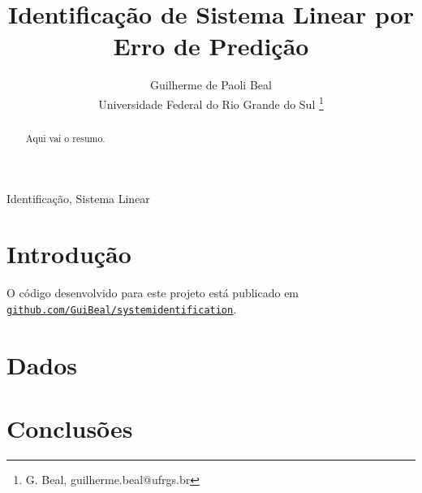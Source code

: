 \documentclass{ppgeesa}
\begin{document}

\title{Identificação de Sistema Linear por Erro de Predição}
\author{Guilherme de Paoli Beal
  \\
  {\small Universidade Federal do Rio Grande do Sul}
  \thanks{G. Beal, guilherme.beal@ufrgs.br}
}
\maketitle
\thispagestyle{empty}\pagestyle{empty}

\begin{abstract}
  Aqui vai o resumo.
\end{abstract}

\begin{IEEEkeywords}
  Identificação, Sistema Linear
\end{IEEEkeywords}

\section{Introdução}

O código desenvolvido para este projeto está publicado em \href{https://github.com/GuiBeal/system-identification}{\texttt{github.com/GuiBeal/system\-identification}}.

\section{Dados}

\section{Conclusões}

% 
% 
\end{document}
